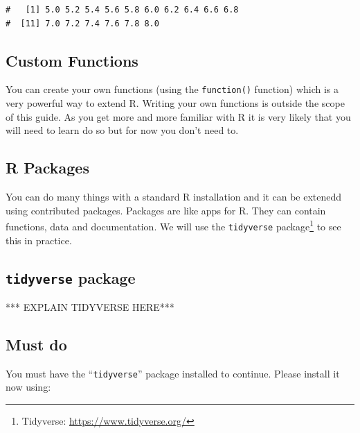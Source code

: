 \documentclass[a4paper,9pt,twocolumn,twoside,printwatermark=false]{pinp}
\begin{document}
\begin{ShadedResult}
\begin{verbatim}
#   [1] 5.0 5.2 5.4 5.6 5.8 6.0 6.2 6.4 6.6 6.8
#  [11] 7.0 7.2 7.4 7.6 7.8 8.0
\end{verbatim}
\end{ShadedResult}

\subsection{Custom Functions}\label{custom-functions}

You can create your own functions (using the \texttt{function()}
function) which is a very powerful way to extend R. Writing your own
functions is outside the scope of this guide. As you get more and more
familiar with R it is very likely that you will need to learn do so but
for now you don't need to.

\subsection{R Packages}\label{r-packages}

You can do many things with a standard R installation and it can be
extenedd using contributed packages. Packages are like apps for R. They
can contain functions, data and documentation. We will use the
\texttt{tidyverse} package\footnote{Tidyverse:
  \url{https://www.tidyverse.org/}} to see this in practice.

\subsection{\texorpdfstring{\texttt{tidyverse}
package}{tidyverse package}}\label{tidyverse-package}

*** EXPLAIN TIDYVERSE HERE***

\subsection{Must do}\label{must-do}

You must have the ``\texttt{tidyverse}'' package installed to continue.
Please install it now using:

\begin{Shaded}
\begin{Highlighting}[]
\NormalTok{(}\NormalTok{)}
\end{Highlighting}
\end{Shaded}
\end{document}
